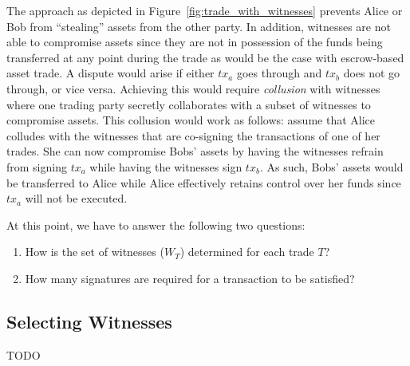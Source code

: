 \documentclass{article}
\begin{document}
The approach as depicted in Figure~\ref{fig:trade_with_witnesses} prevents Alice or Bob from \enquote{stealing} assets from the other party.
In addition, witnesses are not able to compromise assets since they are not in possession of the funds being transferred at any point during the trade as would be the case with escrow-based asset trade.
A dispute would arise if either $ tx_a $ goes through and $ tx_b $ does not go through, or vice versa.
Achieving this would require \emph{collusion} with witnesses where one trading party secretly collaborates with a subset of witnesses to compromise assets.
This collusion would work as follows: assume that Alice colludes with the witnesses that are co-signing the transactions of one of her trades.
She can now compromise Bobs' assets by having the witnesses refrain from signing $ tx_a $ while having the witnesses sign $ tx_b $.
As such, Bobs' assets would be transferred to Alice while Alice effectively retains control over her funds since $ tx_a $ will not be executed.

At this point, we have to answer the following two questions:
\begin{enumerate}
	\item How is the set of witnesses ($ W_T $) determined for each trade $ T $?
	\item How many signatures are required for a transaction to be satisfied?
\end{enumerate}

\subsection{Selecting Witnesses}
TODO
\end{document}
